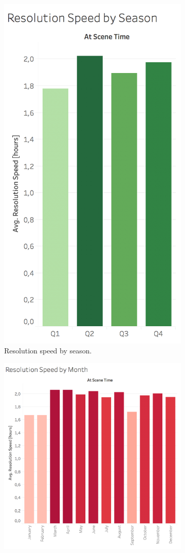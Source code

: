\begin{figure}[h!]
    \begin{subfigure}{0.45\textwidth}
        \centering
        \includegraphics[width=0.532\linewidth]{figures/3_3_resolution_speed_by_season} 
        \caption{Resolution speed by season.}
        \label{fig:3_3_resolution_speed_by_season}
        \vspace*{5mm}
    \end{subfigure}
    \begin{subfigure}{0.55\textwidth}
        \centering
        \includegraphics[width=0.8\linewidth]{figures/3_3_resolution_speed_by_month}

\end{subfigure}
\end{figure}
